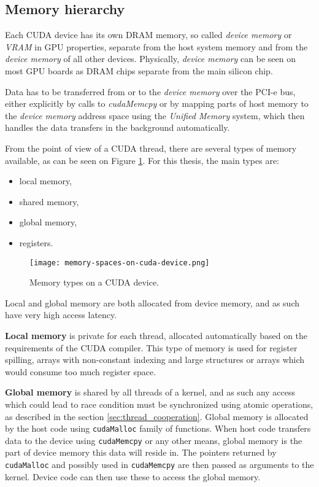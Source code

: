 \subsection{Memory hierarchy}
\label{sec:memory_hierarchy}

Each CUDA device has its own DRAM memory, so called \textit{device memory} or \textit{VRAM} in GPU properties, separate from the host system memory and from the \textit{device memory} of all other devices. Physically, \textit{device memory} can be seen on most GPU boards as DRAM chips separate from the main silicon chip.

Data has to be transferred from or to the \textit{device memory} over the PCI-e bus, either explicitly by calls to \textit{cudaMemcpy} or by mapping parts of host memory to the \textit{device memory} address space using the \textit{Unified Memory} system, which then handles the data transfers in the background automatically.

From the point of view of a CUDA thread, there are several types of memory available, as can be seen on Figure \ref{fig:memory_types}. For this thesis, the main types are:

\begin{itemize}
	\item local memory,
	\item shared memory,
	\item global memory,
	\item registers.
\end{itemize}

\begin{figure}[h]
	\centering
	\texttt{[image: memory-spaces-on-cuda-device.png]}
	\caption{Memory types on a CUDA device.}
	\label{fig:memory_types}
\end{figure}

Local and global memory are both allocated from device memory, and as such have very high access latency. 

\textbf{Local memory} is private for each thread, allocated automatically based on the requirements of the CUDA compiler. This type of memory is used for register spilling, arrays with non-constant indexing and large structures or arrays which would consume too much register space. 

\textbf{Global memory} is shared by all threads of a kernel, and as such any access which could lead to race condition must be synchronized using atomic operations, as described in the section \ref{sec:thread_cooperation}. Global memory is allocated by the host code using \texttt{cudaMalloc} family of functions. When host code transfers data to the device using \texttt{cudaMemcpy} or any other means, global memory is the part of device memory this data will reside in. The pointers returned by \texttt{cudaMalloc} and possibly used in \texttt{cudaMemcpy} are then passed as arguments to the kernel. Device code can then use these to access the global memory. 

